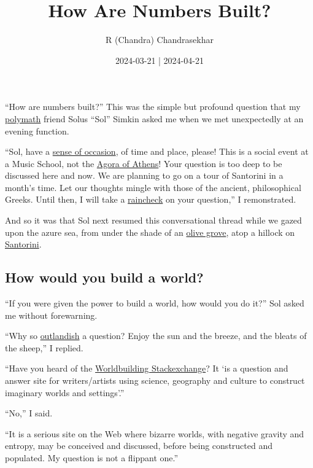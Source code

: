 \documentclass[
  a4paper,
]{article}
\title{How Are Numbers Built?}
\author{R (Chandra) Chandrasekhar}
\date{2024-03-21 | 2024-04-21}
\begin{document}
\maketitle

\thispagestyle{empty}


``How are numbers built?'' This was the simple but profound question
that my \href{https://www.vocabulary.com/dictionary/polymath}{polymath}
friend Solus ``Sol'' Simkin asked me when we met unexpectedly at an
evening function.

``Sol, have a
\href{https://www.collinsdictionary.com/dictionary/english/sense-of-occasion}{sense
of occasion}, of time and place, please! This is a social event at a
Music School, not the
\href{https://en.wikipedia.org/wiki/Ancient_Agora_of_Athens}{Agora of
Athens}! Your question is too deep to be discussed here and now. We are
planning to go on a tour of Santorini in a month's time. Let our
thoughts mingle with those of the ancient, philosophical Greeks. Until
then, I will take a
\href{https://dictionary.cambridge.org/dictionary/english/raincheck}{raincheck}
on your question,'' I remonstrated.

And so it was that Sol next resumed this conversational thread while we
gazed upon the azure sea, from under the shade of an
\href{http://wedding.beleon.com/media/15172-beleontoursgreeceweddingsantoriniolivegrove.jpg}{olive
grove}, atop a hillock on
\href{https://en.wikipedia.org/wiki/Santorini}{Santorini}.

\subsection{How would you build a
world?}\label{how-would-you-build-a-world}

``If you were given the power to build a world, how would you do it?''
Sol asked me without forewarning.

``Why so
\href{https://dictionary.cambridge.org/dictionary/english/outlandish}{outlandish}
a question? Enjoy the sun and the breeze, and the bleats of the sheep,''
I replied.

``Have you heard of the
\href{https://worldbuilding.stackexchange.com/}{Worldbuilding
Stackexchange}? It `is a question and answer site for writers/artists
using science, geography and culture to construct imaginary worlds and
settings'.''

``No,'' I said.

``It is a serious site on the Web where bizarre worlds, with negative
gravity and entropy, may be conceived and discussed, before being
constructed and populated. My question is not a flippant one.''
\end{document}
